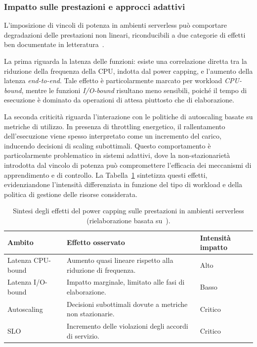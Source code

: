 \subsubsection{Impatto sulle prestazioni e approcci adattivi}

L'imposizione di vincoli di potenza in ambienti serverless può comportare
degradazioni delle prestazioni non lineari, riconducibili a due categorie
di effetti ben documentate in letteratura~\cite{Qiu2023PARM}.

La prima riguarda la latenza delle funzioni: esiste una correlazione
diretta tra la riduzione della frequenza della CPU, indotta dal power
capping, e l'aumento della latenza \emph{end-to-end}. Tale effetto è
particolarmente marcato per workload \emph{CPU-bound}, mentre le funzioni
\emph{I/O-bound} risultano meno sensibili, poiché il tempo di esecuzione
è dominato da operazioni di attesa piuttosto che di elaborazione.

La seconda criticità riguarda l'interazione con le politiche di
autoscaling basate su metriche di utilizzo. In presenza di throttling
energetico, il rallentamento dell'esecuzione viene spesso interpretato
come un incremento del carico, inducendo decisioni di scaling subottimali.
Questo comportamento è particolarmente problematico in sistemi adattivi,
dove la non-stazionarietà introdotta dal vincolo di potenza può
compromettere l'efficacia dei meccanismi di apprendimento e di controllo.
La Tabella~\ref{tab:power_capping_effects} sintetizza questi effetti,
evidenziandone l'intensità differenziata in funzione del tipo di workload
e della politica di gestione delle risorse considerata.

\begin{table}[ht]
    \centering
    \caption{Sintesi degli effetti del power capping sulle prestazioni in
    ambienti serverless (rielaborazione basata su~\cite{Qiu2023PARM}).}
    \label{tab:power_capping_effects}
    \renewcommand{\arraystretch}{1.3}
    \begin{tabular}{@{}lp{6cm}l@{}}
        \toprule
        \textbf{Ambito} & \textbf{Effetto osservato} &
        \textbf{Intensità impatto} \\ \midrule
        Latenza CPU-bound & Aumento quasi lineare rispetto alla riduzione
        di frequenza. & Alto \\
        Latenza I/O-bound & Impatto marginale, limitato alle fasi di
        elaborazione. & Basso \\
        Autoscaling & Decisioni subottimali dovute a metriche non
        stazionarie. & Critico \\
        SLO & Incremento delle violazioni degli accordi di servizio.
        & Critico \\ \bottomrule
    \end{tabular}
\end{table}

